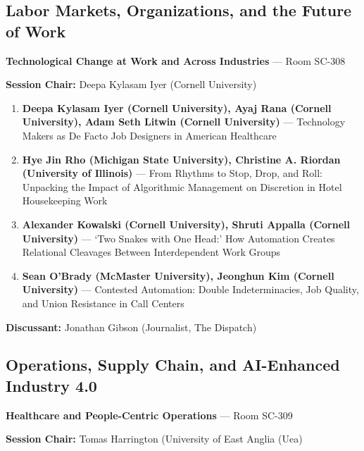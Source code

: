 \documentclass[
  10pt,
  letterpaper,
  DIV=11,
  numbers=noendperiod]{scrartcl}
\begin{document}
\subsection{\texorpdfstring{\textcolor{labor}{Labor Markets, Organizations, and the Future of Work}}{}}\label{section-43}

\textbf{Technological Change at Work and Across Industries} --- Room
SC-308

\textbf{Session Chair:} Deepa Kylasam Iyer (Cornell University)

\begin{enumerate}
\def\labelenumi{\arabic{enumi}.}
\item
  \textbf{Deepa Kylasam Iyer (Cornell University), Ayaj Rana (Cornell
  University), Adam Seth Litwin (Cornell University)} --- Technology
  Makers as De Facto Job Designers in American Healthcare
\item
  \textbf{Hye Jin Rho (Michigan State University), Christine A. Riordan
  (University of Illinois)} --- From Rhythms to Stop, Drop, and Roll:
  Unpacking the Impact of Algorithmic Management on Discretion in Hotel
  Housekeeping Work
\item
  \textbf{Alexander Kowalski (Cornell University), Shruti Appalla
  (Cornell University)} --- `Two Snakes with One Head:' How Automation
  Creates Relational Cleavages Between Interdependent Work Groups
\item
  \textbf{Sean O'Brady (McMaster University), Jeonghun Kim (Cornell
  University)} --- Contested Automation: Double Indeterminacies, Job
  Quality, and Union Resistance in Call Centers
\end{enumerate}

\textbf{Discussant:} Jonathan Gibson (Journalist, The Dispatch)

\subsection{\texorpdfstring{\textcolor{operations}{Operations, Supply Chain, and AI-Enhanced Industry 4.0}}{}}\label{section-44}

\textbf{Healthcare and People-Centric Operations} --- Room SC-309

\textbf{Session Chair:} Tomas Harrington (University of East Anglia
(Uea)
\end{document}
